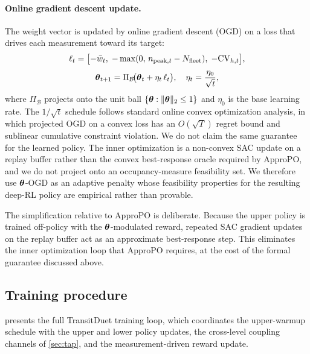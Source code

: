 \paragraph{Online gradient descent update.}
The weight vector is updated by online gradient descent (OGD) on a loss that drives each measurement toward its target:
\begin{equation}
\label{eq:ogd_loss}
    \ell_t = \bigl[-\bar{w}_t,\; -\max(0,\, n_{\mathrm{peak},t} - N_{\mathrm{fleet}}),\; -\mathrm{CV}_{h,t}\bigr],
\end{equation}
\begin{equation}
\label{eq:ogd_update}
    \boldsymbol{\theta}_{t+1} = \Pi_{\mathcal{B}}\!\bigl(\boldsymbol{\theta}_t + \eta_t \, \ell_t\bigr), \quad \eta_t = \frac{\eta_0}{\sqrt{t}},
\end{equation}
where $\Pi_{\mathcal{B}}$ projects onto the unit ball $\{\boldsymbol{\theta} : \|\boldsymbol{\theta}\|_2 \leq 1\}$ and $\eta_0$ is the base learning rate.
The $1/\sqrt{t}$ schedule follows standard online convex optimization analysis, in which projected OGD on a convex loss has an $O(\sqrt{T})$ regret bound and sublinear cumulative constraint violation. We do not claim the same guarantee for the learned policy. The inner optimization is a non-convex SAC update on a replay buffer rather than the convex best-response oracle required by ApproPO, and we do not project onto an occupancy-measure feasibility set. We therefore use $\boldsymbol{\theta}$-OGD as an adaptive penalty whose feasibility properties for the resulting deep-RL policy are empirical rather than provable.

The simplification relative to ApproPO is deliberate. Because the upper policy is trained off-policy with the $\boldsymbol{\theta}$-modulated reward, repeated SAC gradient updates on the replay buffer act as an approximate best-response step. This eliminates the inner optimization loop that ApproPO requires, at the cost of the formal guarantee discussed above.

\subsection{Training procedure}
\label{sec:training}

 presents the full TransitDuet training loop, which coordinates the upper-warmup schedule with the upper and lower policy updates, the cross-level coupling channels of \cref{sec:tap}, and the measurement-driven reward update.

